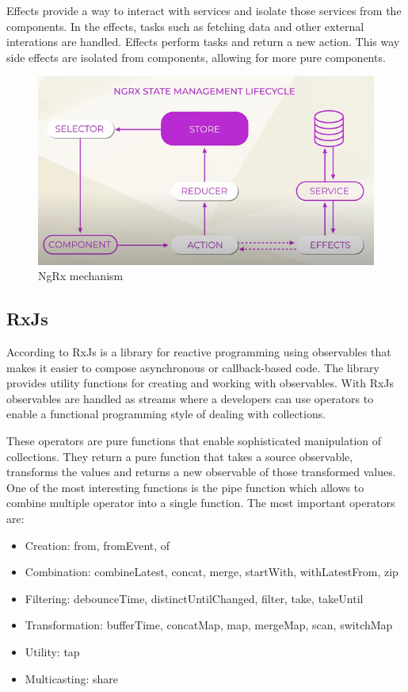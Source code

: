 Effects provide a way to interact with services and isolate those services from the components. In the effects, tasks such as fetching data and other external interations are handled. Effects perform tasks and return a new action. This way side effects are isolated from components, allowing for more pure components.
\autocite{NgRxEffects}


\begin{figure}[h!]
	\caption{NgRx mechanism}
	\centering
	\includegraphics[width=\textwidth]{img/ngrx.png} 
\end{figure}

\subsection{RxJs}
According to \textcite{AngularRxjs} RxJs is a library for reactive programming using observables that makes it easier to compose asynchronous or callback-based code. The library provides utility functions for creating and working with observables. With RxJs observables are handled as streams where a developers can use operators to enable a functional programming style of dealing with collections. \autocite{RxJsDocs}

These operators are pure functions that enable sophisticated manipulation of collections. They return a pure function that takes a source observable, transforms the values and returns a new observable of those transformed values. One of the most interesting functions is the pipe function which allows to combine multiple operator into a single function. The most important operators are:

\begin{itemize}
	\item Creation: from, fromEvent, of
	\item Combination: combineLatest, concat, merge, startWith, withLatestFrom, zip
	\item Filtering: debounceTime, distinctUntilChanged, filter, take, takeUntil
	\item Transformation: bufferTime, concatMap, map, mergeMap, scan, switchMap
	\item Utility: tap
	\item Multicasting: share
\end{itemize}

